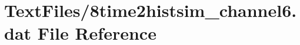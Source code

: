 \hypertarget{8time2histsim__channel6_8dat}{}\section{Text\+Files/8time2histsim\+\_\+channel6.dat File Reference}
\label{8time2histsim__channel6_8dat}
